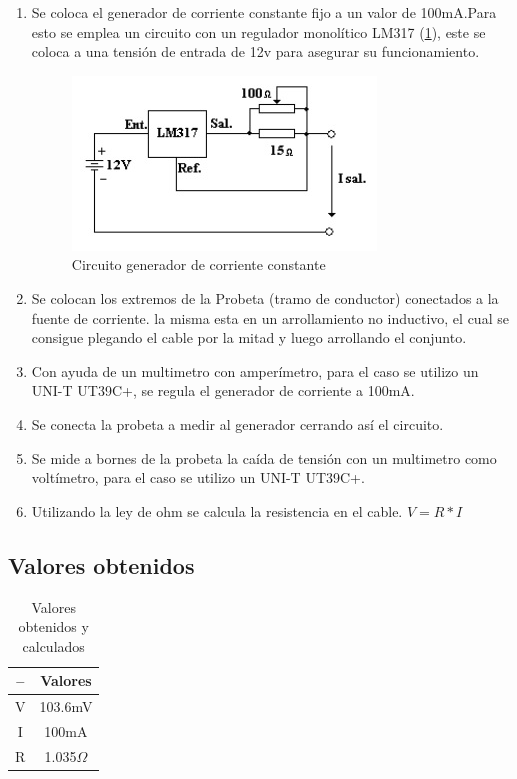 \documentclass[12pt, letterpaper]{article}
\begin{document}
\begin{enumerate}
	\item Se coloca el generador de corriente constante fijo a un valor de 100mA.Para esto se emplea un circuito con un regulador monolítico
	LM317 (\ref{fig.gen_corriente}), este se coloca a una tensión de entrada de 12v para asegurar su funcionamiento.
	
	\begin{figure}[H]
		\centering
		\includegraphics{imagenes/circuito_lm317.jpg}
		\caption{Circuito generador de corriente constante}
        \label{fig.gen_corriente}
	\end{figure}

	\item Se colocan los extremos de la Probeta (tramo de conductor) conectados a la fuente de corriente. la misma esta en un arrollamiento no inductivo, el cual se consigue plegando el cable por la mitad y luego arrollando el conjunto.
 \item Con ayuda de un multimetro con amperímetro, para el caso se utilizo un UNI-T UT39C+, se regula el generador de corriente a 100mA.
 \item Se conecta la probeta a medir al generador cerrando así el circuito.
 \item Se mide a bornes de la probeta la caída de tensión con un multimetro como voltímetro, para el caso se utilizo un UNI-T UT39C+.
 \item Utilizando la ley de ohm se calcula la resistencia en el cable.
$V=R*I$
\end{enumerate}

\subsection{Valores obtenidos}
\begin{table}[H]
    \centering
    \caption{Valores obtenidos y calculados}
    \begin{tabular}{|c|c}\hline
     --   & Valores \\\hline
     V   & 103.6mV   \\ \hline   
     I    &  100mA   \\ \hline
    R   & 1.035$\Omega$  \\ \hline 
    \end{tabular}
    \label{tab:tab_medidas}
\end{table}
\end{document}
